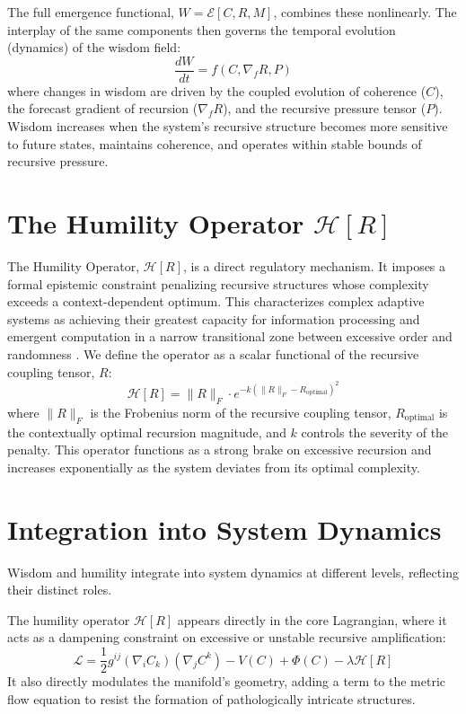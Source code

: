 The full emergence functional, \(W = \mathcal{E}[C, R, M]\), combines these nonlinearly. The interplay of the same components then governs the temporal evolution (dynamics) of the wisdom field:
\begin{equation}
\frac{dW}{dt} = f(C, \nabla_f R, P)
\end{equation}
where changes in wisdom are driven by the coupled evolution of coherence (\(C\)), the forecast gradient of recursion (\(\nabla_f R\)), and the recursive pressure tensor (\(P\)). Wisdom increases when the system's recursive structure becomes more sensitive to future states, maintains coherence, and operates within stable bounds of recursive pressure.

\section{The Humility Operator \(\mathcal{H}[R]\)}

The Humility Operator, \(\mathcal{H}[R]\), is a direct regulatory mechanism. It imposes a formal epistemic constraint penalizing recursive structures whose complexity exceeds a context-dependent optimum. This characterizes complex adaptive systems as achieving their greatest capacity for information processing and emergent computation in a narrow transitional zone between excessive order and randomness \autocite{Langton1990}. We define the operator as a scalar functional of the recursive coupling tensor, \(R\):
\begin{equation}
\mathcal{H}[R] = \|R\|_F \cdot e^{-k(\|R\|_F - R_{\text{optimal}})^2}
\end{equation}
where \(\|R\|_F\) is the Frobenius norm of the recursive coupling tensor, \(R_{\text{optimal}}\) is the contextually optimal recursion magnitude, and \(k\) controls the severity of the penalty. This operator functions as a strong brake on excessive recursion and increases exponentially as the system deviates from its optimal complexity.

\section{Integration into System Dynamics}

Wisdom and humility integrate into system dynamics at different levels, reflecting their distinct roles.

The humility operator \(\mathcal{H}[R]\) appears directly in the core Lagrangian, where it acts as a dampening constraint on excessive or unstable recursive amplification:
\begin{equation}
\mathcal{L} = \frac{1}{2} g^{ij} (\nabla_i C_k)(\nabla_j C^k) - V(C) + \Phi(C) - \lambda \mathcal{H}[R]
\end{equation}
It also directly modulates the manifold's geometry, adding a term to the metric flow equation to resist the formation of pathologically intricate structures.

